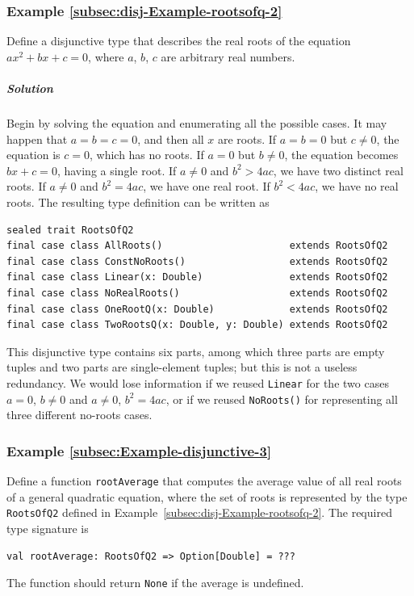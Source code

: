 \subsubsection{Example \label{subsec:disj-Example-rootsofq-2}\ref{subsec:disj-Example-rootsofq-2}}

Define a disjunctive type that describes the real roots of the equation
$ax^{2}+bx+c=0$, where $a$, $b$, $c$ are arbitrary real numbers.

\subparagraph{Solution}

Begin by solving the equation and enumerating all the possible cases.
It may happen that $a=b=c=0$, and then all $x$ are roots. If $a=b=0$
but $c\neq0$, the equation is $c=0$, which has no roots. If $a=0$
but $b\neq0$, the equation becomes $bx+c=0$, having a single root.
If $a\neq0$ and $b^{2}>4ac$, we have two distinct real roots. If
$a\neq0$ and $b^{2}=4ac$, we have one real root. If $b^{2}<4ac$,
we have no real roots. The resulting type definition can be written
as
\begin{lstlisting}
sealed trait RootsOfQ2
final case class AllRoots()                      extends RootsOfQ2
final case class ConstNoRoots()                  extends RootsOfQ2
final case class Linear(x: Double)               extends RootsOfQ2
final case class NoRealRoots()                   extends RootsOfQ2
final case class OneRootQ(x: Double)             extends RootsOfQ2
final case class TwoRootsQ(x: Double, y: Double) extends RootsOfQ2
\end{lstlisting}
This disjunctive type contains six parts, among which three parts
are empty tuples and two parts are single-element tuples; but this
is not a useless redundancy. We would lose information if we reused
\lstinline!Linear! for the two cases $a=0$, $b\neq0$ and $a\neq0$,
$b^{2}=4ac$, or if we reused \lstinline!NoRoots()! for representing
all three different no-roots cases.

\subsubsection{Example \label{subsec:Example-disjunctive-3}\ref{subsec:Example-disjunctive-3}}

Define a function \lstinline!rootAverage! that computes the average
value of all real roots of a general quadratic equation, where the
set of roots is represented by the type \lstinline!RootsOfQ2! defined
in Example~\ref{subsec:disj-Example-rootsofq-2}. The required type
signature is
\begin{lstlisting}
val rootAverage: RootsOfQ2 => Option[Double] = ???
\end{lstlisting}
The function should return \lstinline!None! if the average is undefined.

